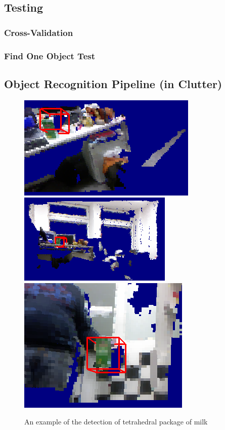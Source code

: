 \documentclass[conference]{sty/IEEEtran}
\begin{document}
\subsection{Testing}
\subsubsection{Cross-Validation}

\subsubsection{Find One Object Test}

\subsection{Object Recognition Pipeline (in Clutter)}
\begin{figure}[htb!]
  \begin{center}
    \includegraphics[width=.45\columnwidth]{figures/colorCHLAC/detection7.png}
\hfill
    \includegraphics[width=.45\columnwidth]{figures/colorCHLAC/detection5.png} \\
\hfill
    \includegraphics[width=.9\columnwidth]{figures/colorCHLAC/detection2.png}
\caption{An example of the detection of tetrahedral package of milk}
    \label{fig:milk_testing}
  \end{center}
\end{figure}
\end{document}

